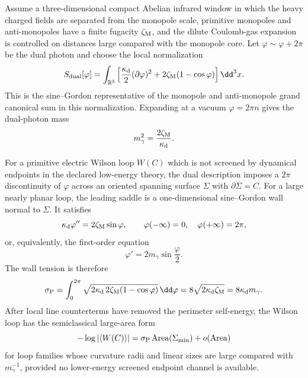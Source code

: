 \begin{controlledapproximation}
\label{ca:polyakov-monopole-gas-area-law}
Assume a three-dimensional compact Abelian infrared window in which the heavy
charged fields are separated from the monopole scale, primitive monopoles and
anti-monopoles have a finite fugacity \(\zeta_{\rm M}\), and the dilute
Coulomb-gas expansion is controlled on distances large compared with the
monopole core.  Let \(\varphi\sim\varphi+2\pi\) be the dual photon and choose
the local normalization
\begin{equation}
  S_{\rm dual}[\varphi]
  =
  \int_{\mathbb R^3}
  \left[
    \frac{\kappa_{\rm d}}2(\partial\varphi)^2
    +
    2\zeta_{\rm M}(1-\cos\varphi)
  \right]\dd^3x .
  \label{eq:polyakov-dual-photon-action}
\end{equation}
This is the sine--Gordon representative of the monopole and anti-monopole
grand canonical sum in this normalization.  Expanding at a vacuum
\(\varphi=2\pi n\) gives the dual-photon mass
\begin{equation}
  m_\gamma^2=\frac{2\zeta_{\rm M}}{\kappa_{\rm d}} .
  \label{eq:polyakov-dual-photon-mass}
\end{equation}

For a primitive electric Wilson loop \(W(C)\) which is not screened by
dynamical endpoints in the declared low-energy theory, the dual description
imposes a \(2\pi\) discontinuity of \(\varphi\) across an oriented spanning
surface \(\Sigma\) with \(\partial\Sigma=C\).  For a large nearly planar loop,
the leading saddle is a one-dimensional sine--Gordon wall normal to
\(\Sigma\).  It satisfies
\[
  \kappa_{\rm d}\varphi''=2\zeta_{\rm M}\sin\varphi,\qquad
  \varphi(-\infty)=0,\quad \varphi(+\infty)=2\pi,
\]
or, equivalently, the first-order equation
\begin{equation}
  \varphi'=2m_\gamma\sin\frac{\varphi}{2}.
  \label{eq:polyakov-wall-first-order}
\end{equation}
The wall tension is therefore
\begin{equation}
  \sigma_{\rm P}
  =
  \int_0^{2\pi}
  \sqrt{2\kappa_{\rm d}\,2\zeta_{\rm M}(1-\cos\varphi)}\,\dd\varphi
  =
  8\sqrt{2\kappa_{\rm d}\zeta_{\rm M}}
  =
  8\kappa_{\rm d}m_\gamma .
  \label{eq:polyakov-wall-string-tension}
\end{equation}
After local line counterterms have removed the perimeter self-energy, the
Wilson loop has the semiclassical large-area form
\begin{equation}
  -\log |\langle W(C)\rangle|
  =
  \sigma_{\rm P}\operatorname{Area}(\Sigma_{\rm min})
  +o(\operatorname{Area})
  \label{eq:polyakov-monopole-wilson-area-law}
\end{equation}
for loop families whose curvature radii and linear sizes are large compared
with \(m_\gamma^{-1}\), provided no lower-energy screened endpoint channel is
available.


\end{controlledapproximation}
